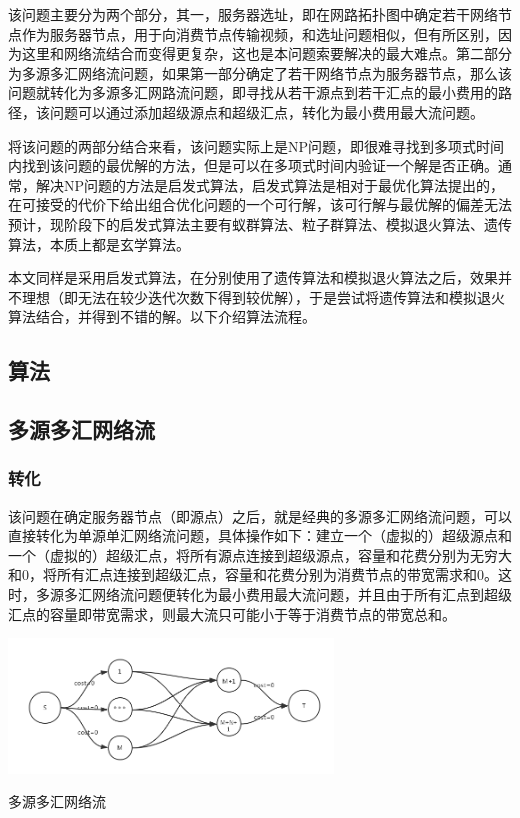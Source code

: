 \documentclass[a4paper,11pt,onecolumn,twoside]{article}
\makeatletter
\newenvironment{figurehere}
  {\def\@captype{figure}}
  {}
\makeatother
\begin{document}
\begin{multicols}{2}
该问题主要分为两个部分，其一，服务器选址，即在网路拓扑图中确定若干网络节点作为服务器节点，用于向消费节点传输视频，和选址问题相似，但有所区别，因为这里和网络流结合而变得更复杂，这也是本问题索要解决的最大难点。第二部分为多源多汇网络流问题，如果第一部分确定了若干网络节点为服务器节点，那么该问题就转化为多源多汇网路流问题，即寻找从若干源点到若干汇点的最小费用的路径，该问题可以通过添加超级源点和超级汇点，转化为最小费用最大流问题。

将该问题的两部分结合来看，该问题实际上是NP问题，即很难寻找到多项式时间内找到该问题的最优解的方法，但是可以在多项式时间内验证一个解是否正确。通常，解决NP问题的方法是启发式算法，启发式算法是相对于最优化算法提出的，在可接受的代价下给出组合优化问题的一个可行解，该可行解与最优解的偏差无法预计，现阶段下的启发式算法主要有蚁群算法、粒子群算法、模拟退火算法、遗传算法，本质上都是玄学算法。

本文同样是采用启发式算法，在分别使用了遗传算法和模拟退火算法之后，效果并不理想（即无法在较少迭代次数下得到较优解），于是尝试将遗传算法和模拟退火算法结合，并得到不错的解。以下介绍算法流程。

\subsection{算法}

\subsection{多源多汇网络流}
\subsubsection{转化}
该问题在确定服务器节点（即源点）之后，就是经典的多源多汇网络流问题，可以直接转化为单源单汇网络流问题，具体操作如下：建立一个（虚拟的）超级源点和一个（虚拟的）超级汇点，将所有源点连接到超级源点，容量和花费分别为无穷大和0，将所有汇点连接到超级汇点，容量和花费分别为消费节点的带宽需求和0。这时，多源多汇网络流问题便转化为最小费用最大流问题，并且由于所有汇点到超级汇点的容量即带宽需求，则最大流只可能小于等于消费节点的带宽总和。

\begin{figurehere}
	\centering
	\includegraphics[width=3.4in]{imgs/多源多汇网络流}
	\caption{多源多汇网络流}
	\label{dydhwll}
\end{figurehere}


\end{multicols}
\end{document}
